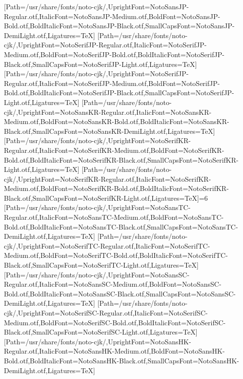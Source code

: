 \newfontfamily{}[Path=/usr/share/fonts/noto-cjk/,UprightFont=NotoSansJP-Regular.otf,ItalicFont=NotoSansJP-Medium.otf,BoldFont=NotoSansJP-Bold.otf,BoldItalicFont=NotoSansJP-Black.otf,SmallCapsFont=NotoSansJP-DemiLight.otf,Ligatures=TeX]
\newfontfamily{}[Path=/usr/share/fonts/noto-cjk/,UprightFont=NotoSerifJP-Regular.otf,ItalicFont=NotoSerifJP-Medium.otf,BoldFont=NotoSerifJP-Bold.otf,BoldItalicFont=NotoSerifJP-Black.otf,SmallCapsFont=NotoSerifJP-Light.otf,Ligatures=TeX]
\newfontfamily{}[Path=/usr/share/fonts/noto-cjk/,UprightFont=NotoSerifJP-Regular.otf,ItalicFont=NotoSerifJP-Medium.otf,BoldFont=NotoSerifJP-Bold.otf,BoldItalicFont=NotoSerifJP-Black.otf,SmallCapsFont=NotoSerifJP-Light.otf,Ligatures=TeX]
\newfontfamily{}[Path=/usr/share/fonts/noto-cjk/,UprightFont=NotoSansKR-Regular.otf,ItalicFont=NotoSansKR-Medium.otf,BoldFont=NotoSansKR-Bold.otf,BoldItalicFont=NotoSansKR-Black.otf,SmallCapsFont=NotoSansKR-DemiLight.otf,Ligatures=TeX]
\newfontfamily{}[Path=/usr/share/fonts/noto-cjk/,UprightFont=NotoSerifKR-Regular.otf,ItalicFont=NotoSerifKR-Medium.otf,BoldFont=NotoSerifKR-Bold.otf,BoldItalicFont=NotoSerifKR-Black.otf,SmallCapsFont=NotoSerifKR-Light.otf,Ligatures=TeX]
\newfontfamily{}[Path=/usr/share/fonts/noto-cjk/,UprightFont=NotoSerifKR-Regular.otf,ItalicFont=NotoSerifKR-Medium.otf,BoldFont=NotoSerifKR-Bold.otf,BoldItalicFont=NotoSerifKR-Black.otf,SmallCapsFont=NotoSerifKR-Light.otf,Ligatures=TeX]\else\ifnum\value{NotoCJKFamily}=6
\newfontfamily{}[Path=/usr/share/fonts/noto-cjk/,UprightFont=NotoSansTC-Regular.otf,ItalicFont=NotoSansTC-Medium.otf,BoldFont=NotoSansTC-Bold.otf,BoldItalicFont=NotoSansTC-Black.otf,SmallCapsFont=NotoSansTC-DemiLight.otf,Ligatures=TeX]
\newfontfamily{}[Path=/usr/share/fonts/noto-cjk/,UprightFont=NotoSerifTC-Regular.otf,ItalicFont=NotoSerifTC-Medium.otf,BoldFont=NotoSerifTC-Bold.otf,BoldItalicFont=NotoSerifTC-Black.otf,SmallCapsFont=NotoSerifTC-Light.otf,Ligatures=TeX]
\newfontfamily{}[Path=/usr/share/fonts/noto-cjk/,UprightFont=NotoSansSC-Regular.otf,ItalicFont=NotoSansSC-Medium.otf,BoldFont=NotoSansSC-Bold.otf,BoldItalicFont=NotoSansSC-Black.otf,SmallCapsFont=NotoSansSC-DemiLight.otf,Ligatures=TeX]
\newfontfamily{}[Path=/usr/share/fonts/noto-cjk/,UprightFont=NotoSerifSC-Regular.otf,ItalicFont=NotoSerifSC-Medium.otf,BoldFont=NotoSerifSC-Bold.otf,BoldItalicFont=NotoSerifSC-Black.otf,SmallCapsFont=NotoSerifSC-Light.otf,Ligatures=TeX]
\newfontfamily{}[Path=/usr/share/fonts/noto-cjk/,UprightFont=NotoSansHK-Regular.otf,ItalicFont=NotoSansHK-Medium.otf,BoldFont=NotoSansHK-Bold.otf,BoldItalicFont=NotoSansHK-Black.otf,SmallCapsFont=NotoSansHK-DemiLight.otf,Ligatures=TeX]
